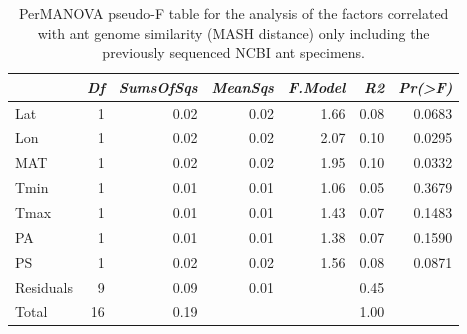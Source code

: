 \begin{table}[ht]
\centering
\begin{tabular}{lrrrrrr}
  \hline
 & {\emph{Df}} & {\emph{SumsOfSqs}} & {\emph{MeanSqs}} & {\emph{F.Model}} & {\emph{R2}} & {\emph{Pr(>F)}} \\ 
  \hline
Lat & 1 & 0.02 & 0.02 & 1.66 & 0.08 & 0.0683 \\ 
  Lon & 1 & 0.02 & 0.02 & 2.07 & 0.10 & 0.0295 \\ 
  MAT & 1 & 0.02 & 0.02 & 1.95 & 0.10 & 0.0332 \\ 
  Tmin & 1 & 0.01 & 0.01 & 1.06 & 0.05 & 0.3679 \\ 
  Tmax & 1 & 0.01 & 0.01 & 1.43 & 0.07 & 0.1483 \\ 
  PA & 1 & 0.01 & 0.01 & 1.38 & 0.07 & 0.1590 \\ 
  PS & 1 & 0.02 & 0.02 & 1.56 & 0.08 & 0.0871 \\ 
  Residuals & 9 & 0.09 & 0.01 &  & 0.45 &  \\ 
  Total & 16 & 0.19 &  &  & 1.00 &  \\ 
   \hline
\end{tabular}
\caption{PerMANOVA pseudo-F table for the analysis of the factors 
correlated with ant genome similarity (MASH distance) only including the 
previously sequenced NCBI ant specimens.} 
\label{tab:perm_mash_napg}
\end{table}
